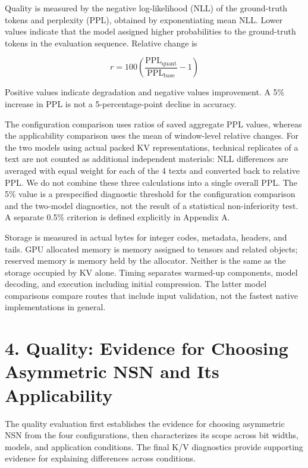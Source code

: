 \documentclass[10pt,a4paper]{article}
\begin{document}
Quality is measured by the negative log-likelihood (NLL) of the ground-truth tokens and perplexity (PPL), obtained by exponentiating mean NLL. Lower values indicate that the model assigned higher probabilities to the ground-truth tokens in the evaluation sequence. Relative change is

\[
r=100\left(\frac{\mathrm{PPL}_{\mathrm{quant}}}{\mathrm{PPL}_{\mathrm{base}}}-1\right)
\]

Positive values indicate degradation and negative values improvement. A 5\% increase in PPL is not a 5-percentage-point decline in accuracy.

The configuration comparison uses ratios of saved aggregate PPL values, whereas the applicability comparison uses the mean of window-level relative changes. For the two models using actual packed KV representations, technical replicates of a text are not counted as additional independent materials: NLL differences are averaged with equal weight for each of the 4 texts and converted back to relative PPL. We do not combine these three calculations into a single overall PPL. The 5\% value is a prespecified diagnostic threshold for the configuration comparison and the two-model diagnostics, not the result of a statistical non-inferiority test. A separate 0.5\% criterion is defined explicitly in Appendix A.

Storage is measured in actual bytes for integer codes, metadata, headers, and tails. GPU allocated memory is memory assigned to tensors and related objects; reserved memory is memory held by the allocator. Neither is the same as the storage occupied by KV alone. Timing separates warmed-up components, model decoding, and execution including initial compression. The latter model comparisons compare routes that include input validation, not the fastest native implementations in general.

\section{4. Quality: Evidence for Choosing Asymmetric NSN and Its Applicability}\label{quality-evidence-for-choosing-asymmetric-nsn-and-its-applicability}

The quality evaluation first establishes the evidence for choosing asymmetric NSN from the four configurations, then characterizes its scope across bit widths, models, and application conditions. The final K/V diagnostics provide supporting evidence for explaining differences across conditions.
\end{document}
